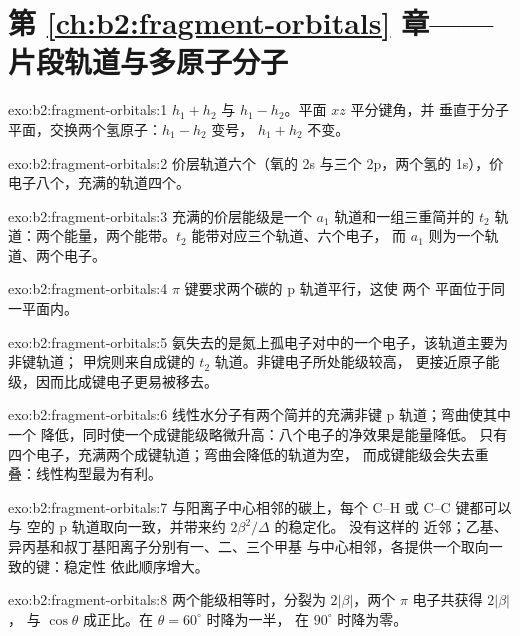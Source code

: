 \section*{第 \ref{ch:b2:fragment-orbitals} 章——片段轨道与多原子分子}

\begin{solution}{exo:b2:fragment-orbitals:1}
$h_1 + h_2$ 与 $h_1 - h_2$。平面 $xz$ 平分键角，并
垂直于分子平面，交换两个氢原子：$h_1 - h_2$ 变号，
$h_1 + h_2$ 不变。
\end{solution}

\begin{solution}{exo:b2:fragment-orbitals:2}
价层轨道六个（氧的 2s 与三个 2p，两个氢的 1s），价
电子八个，充满的轨道四个。
\end{solution}

\begin{solution}{exo:b2:fragment-orbitals:3}
充满的价层能级是一个 $a_1$ 轨道和一组三重简并的 $t_2$
轨道：两个能量，两个能带。$t_2$ 能带对应三个轨道、六个电子，
而 $a_1$ 则为一个轨道、两个电子。
\end{solution}

\begin{solution}{exo:b2:fragment-orbitals:4}
$\pi$ 键要求两个碳的 p 轨道平行，这使
两个  平面位于同一平面内。
\end{solution}

\begin{solution}{exo:b2:fragment-orbitals:5}
氨失去的是氮上孤电子对中的一个电子，该轨道主要为非键轨道；
甲烷则来自成键的 $t_2$ 轨道。非键电子所处能级较高，
更接近原子能级，因而比成键电子更易被移去。
\end{solution}

\begin{solution}{exo:b2:fragment-orbitals:6}
线性水分子有两个简并的充满非键 p 轨道；弯曲使其中一个
降低，同时使一个成键能级略微升高：八个电子的净效果是能量降低。
只有四个电子，充满两个成键轨道；弯曲会降低的轨道为空，
而成键能级会失去重叠：线性构型最为有利。
\end{solution}

\begin{solution}{exo:b2:fragment-orbitals:7}
与阳离子中心相邻的碳上，每个 C--H 或 C--C 键都可以与
空的 p 轨道取向一致，并带来约 $2\beta^2/\Delta$ 的稳定化。 没有这样的
近邻；乙基、异丙基和叔丁基阳离子分别有一、二、三个甲基
与中心相邻，各提供一个取向一致的键：稳定性
依此顺序增大。
\end{solution}

\begin{solution}{exo:b2:fragment-orbitals:8}
两个能级相等时，分裂为 $2|\beta|$，两个 $\pi$ 电子共获得 $2|\beta|$，
与 $\cos\theta$ 成正比。在 $\theta = 60^\circ$ 时降为一半，
在 $90^\circ$ 时降为零。
\end{solution}

